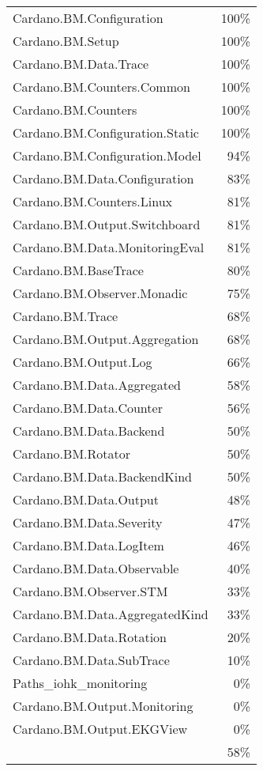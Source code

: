 \begin{tabular}{l r}
   Cardano.BM.Configuration & 100\% \\
   Cardano.BM.Setup & 100\% \\
   Cardano.BM.Data.Trace & 100\% \\
   Cardano.BM.Counters.Common & 100\% \\
   Cardano.BM.Counters & 100\% \\
   Cardano.BM.Configuration.Static & 100\% \\
   Cardano.BM.Configuration.Model & 94\% \\
   Cardano.BM.Data.Configuration & 83\% \\
   Cardano.BM.Counters.Linux & 81\% \\
   Cardano.BM.Output.Switchboard & 81\% \\
   Cardano.BM.Data.MonitoringEval & 81\% \\
   Cardano.BM.BaseTrace & 80\% \\
   Cardano.BM.Observer.Monadic & 75\% \\
   Cardano.BM.Trace & 68\% \\
   Cardano.BM.Output.Aggregation & 68\% \\
   Cardano.BM.Output.Log & 66\% \\
   Cardano.BM.Data.Aggregated & 58\% \\
   Cardano.BM.Data.Counter & 56\% \\
   Cardano.BM.Data.Backend & 50\% \\
   Cardano.BM.Rotator & 50\% \\
   Cardano.BM.Data.BackendKind & 50\% \\
   Cardano.BM.Data.Output & 48\% \\
   Cardano.BM.Data.Severity & 47\% \\
   Cardano.BM.Data.LogItem & 46\% \\
   Cardano.BM.Data.Observable & 40\% \\
   Cardano.BM.Observer.STM & 33\% \\
   Cardano.BM.Data.AggregatedKind & 33\% \\
   Cardano.BM.Data.Rotation & 20\% \\
   Cardano.BM.Data.SubTrace & 10\% \\
   Paths\_iohk\_monitoring & 0\% \\
   Cardano.BM.Output.Monitoring & 0\% \\
   Cardano.BM.Output.EKGView & 0\% \\
    & 58\% \\
\end{tabular}
